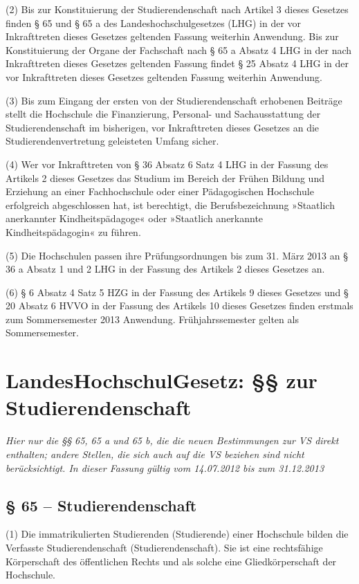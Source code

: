 \documentclass[
10pt,
a4paper,
twoside,								%
titlepage=false,							%
draft=false								%
]{scrartcl}
\begin{document}
(2) Bis zur Konstituierung der Studierendenschaft nach Artikel 3 dieses Gesetzes finden § 65 und § 65 a des Landeshochschulgesetzes (LHG) in der vor Inkrafttreten dieses Gesetzes geltenden Fassung weiterhin Anwendung. Bis zur Konstituierung der Organe der Fachschaft nach § 65 a Absatz 4 LHG in der nach Inkrafttreten dieses Gesetzes geltenden Fassung findet § 25 Absatz 4 LHG in der vor Inkrafttreten dieses Gesetzes geltenden Fassung weiterhin Anwendung. 

(3) Bis zum Eingang der ersten von der Studierendenschaft erhobenen Beiträge stellt die Hochschule die Finanzierung, Personal- und Sachausstattung der Studierendenschaft im bisherigen, vor Inkrafttreten dieses Gesetzes an die Studierendenvertretung geleisteten Umfang sicher.

(4) Wer vor Inkrafttreten von § 36 Absatz 6 Satz 4 LHG in der Fassung des Artikels 2 dieses Gesetzes das Studium im Bereich der Frühen Bildung und Erziehung an einer Fachhochschule oder einer Pädagogischen Hochschule erfolgreich abgeschlossen hat, ist berechtigt, die Berufsbezeichnung »Staatlich anerkannter Kindheitspädagoge« oder »Staatlich anerkannte Kindheitspädagogin« zu führen.

(5) Die Hochschulen passen ihre Prüfungsordnungen bis zum 31. März 2013 an § 36 a Absatz 1 und 2 LHG in der Fassung des Artikels 2 dieses Gesetzes an.

(6) § 6 Absatz 4 Satz 5 HZG in der Fassung des Artikels 9 dieses Gesetzes und § 20 Absatz 6 HVVO in der Fassung des Artikels 10 dieses Gesetzes finden erstmals zum Sommersemester 2013 Anwendung. Frühjahrssemester gelten als Sommersemester.

\newpage
\section{LandesHochschulGesetz: §§ zur Studierendenschaft}

\emph{Hier nur die §§ 65, 65 a und 65 b, die die neuen Bestimmungen zur VS direkt enthalten; andere Stellen, die sich auch auf die VS beziehen sind nicht berücksichtigt. In dieser Fassung gültig vom 14.07.2012 bis zum 31.12.2013}

\subsection{§ 65 – Studierendenschaft}

(1) Die immatrikulierten Studierenden (Studierende) einer Hochschule bilden die Verfasste Studierendenschaft (Studierendenschaft). Sie ist eine rechtsfähige Körperschaft des öffentlichen Rechts und als solche eine Gliedkörperschaft der Hochschule.
\end{document}
